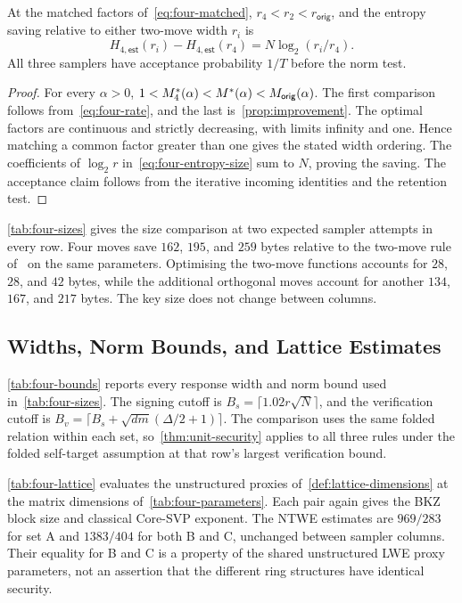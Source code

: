 \begin{proposition}
\label{prop:four-size}
At the matched factors of~\cref{eq:four-matched}, $r_4<r_2<r_{\mathsf{orig}}$, and the entropy saving relative to either two-move width $r_i$ is
\[
 H_{4,\mathsf{est}}(r_i)-H_{4,\mathsf{est}}(r_4)
 =N\log_2(r_i/r_4).
\]
All three samplers have acceptance probability $1/T$ before the norm test.
\end{proposition}
\begin{proof}
For every $\alpha>0$, $1<M_4^*(\alpha)<M^*(\alpha)<M_{\mathsf{orig}}(\alpha)$. The first comparison follows from~\cref{eq:four-rate}, and the last is~\cref{prop:improvement}. The optimal factors are continuous and strictly decreasing, with limits infinity and one. Hence matching a common factor greater than one gives the stated width ordering. The coefficients of $\log_2r$ in~\cref{eq:four-entropy-size} sum to $N$, proving the saving. The acceptance claim follows from the iterative incoming identities and the retention test.
\end{proof}

\cref{tab:four-sizes} gives the size comparison at two expected sampler attempts in every row. Four moves save $162$, $195$, and $259$ bytes relative to the two-move rule of~\cite{GartnerFull} on the same parameters. Optimising the two-move functions accounts for $28$, $28$, and $42$ bytes, while the additional orthogonal moves account for another $134$, $167$, and $217$ bytes. The key size does not change between columns.


\subsection{Widths, Norm Bounds, and Lattice Estimates}

\cref{tab:four-bounds} reports every response width and norm bound used in~\cref{tab:four-sizes}. The signing cutoff is $B_s=\lceil1.02r\sqrt N\rceil$, and the verification cutoff is $B_v=\lceil B_s+\sqrt{dm}(\Delta/2+1)\rceil$. The comparison uses the same folded relation within each set, so~\cref{thm:unit-security} applies to all three rules under the folded self-target assumption at that row's largest verification bound.


\cref{tab:four-lattice} evaluates the unstructured proxies of~\cref{def:lattice-dimensions} at the matrix dimensions of~\cref{tab:four-parameters}. Each pair again gives the BKZ block size and classical Core-SVP exponent. The NTWE estimates are $969/283$ for set A and $1383/404$ for both B and C, unchanged between sampler columns. Their equality for B and C is a property of the shared unstructured LWE proxy parameters, not an assertion that the different ring structures have identical security.

